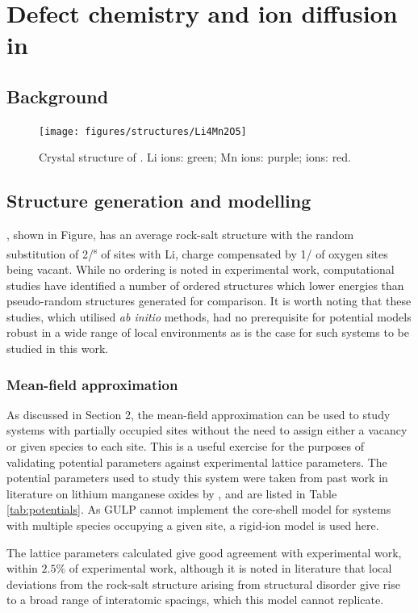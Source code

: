 \chapter{Defect chemistry and  ion diffusion in }
\section{Background}
\newpage
\begin{figure}
\centering
\texttt{[image: figures/structures/Li4Mn2O5]}
\caption[Crystal structure of ]{Crystal structure of . Li ions: green; Mn ions: purple;  ions: red.}
\end{figure}
\section{Structure generation and modelling}
, shown in Figure, has an average  rock-salt structure with the random substitution of 2/\textsuperscript{s} of  sites with Li, charge compensated by 1/ of oxygen sites being vacant.
While no ordering is noted in experimental work,\cite{Freire2016,Diaz-Lopez2018a} computational studies have identified a number of ordered structures which lower energies than pseudo-random structures generated for comparison.\cite{Diaz-Lopez2017,Bhandari2019}
It is worth noting that these studies, which utilised \textit{ab initio} methods, had no prerequisite for potential models robust in a wide range of local environments as is the case for such systems to be studied in this work.

\newpage
\subsection{Mean-field approximation}
As discussed in {\color{red} Section 2}, the mean-field approximation can be used to study systems with partially occupied sites without the need to assign either a vacancy or given species to each site.
This is a useful exercise for the purposes of validating potential parameters against experimental lattice parameters.
The potential parameters used to study this system were taken from past work in literature on lithium manganese oxides by \citet{Ammundsen1999}, and are listed in Table \ref{tab:potentials}.
As GULP cannot implement the core-shell model for systems with multiple species occupying a given site, a rigid-ion model is used here.

The lattice parameters calculated give good agreement with experimental work, within $2.5\%$ of experimental work, although it is noted in literature that local deviations from the rock-salt structure arising from structural disorder give rise to a broad range of interatomic spacings, which this model cannot replicate.

